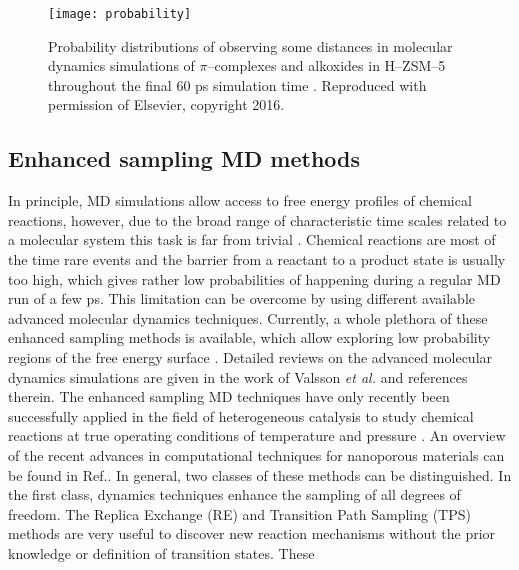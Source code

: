 \begin{figure}[!h]
	\centering
	\texttt{[image: probability]}
	\caption[Probability distributions of observing some distances in molecular
	dynamics simulations of $\pi$--complexes and alkoxides in H--ZSM--5 throughout
	the final 60 ps simulation time.]{Probability distributions of observing some distances in molecular
	dynamics simulations of $\pi$--complexes and alkoxides in H--ZSM--5 throughout
	the final 60 ps simulation time \cite{Hajek2016}. Reproduced with
	permission of Elsevier, copyright 2016.}
	\label{fig:probability}
\end{figure}


\subsection*{Enhanced sampling MD methods}
In principle, MD simulations allow access to free energy profiles of chemical
reactions, however, due to the broad range of characteristic time scales related to a molecular system this task is far from trivial \cite{ Fleurat2005}. Chemical reactions are most of the time rare events and the barrier from a reactant to a product state is usually too high, which gives rather low probabilities of happening during a regular MD run of a few ps.  This limitation can be overcome by using different available advanced molecular dynamics techniques. Currently, a whole plethora of these enhanced sampling
methods  is available, which allow exploring low probability regions of
the free energy surface \cite{ Laio2002,  Sutto2012, Carter1989, Darve2001,
Jarzynski1997,  Rosso2002, Gullingsrud1999}. Detailed reviews on the advanced
molecular dynamics simulations are given in the work of Valsson \textit{et
al.}\cite{Valsson2016} and references therein. The enhanced sampling MD techniques have only recently been successfully applied in the field of heterogeneous catalysis to study chemical reactions at true operating conditions of temperature and
pressure \cite{DeWispelaere2016, DeWispelaere2015, VanSpeybroeck2014,
Cnudde2017, Haigis2015, Bucko2011}. An overview of the recent advances in
computational techniques for nanoporous materials can be found in
Ref.\cite{Evans2017, Fraux2017}. In general, two classes of these methods can be
distinguished. In the first class, dynamics techniques enhance the sampling of all degrees of freedom.
The Replica Exchange (RE) \cite{Sugita1999} and Transition Path Sampling
(TPS)\cite{Dellago2006} methods are very useful to discover new reaction
mechanisms without the prior knowledge or definition of transition states. These
